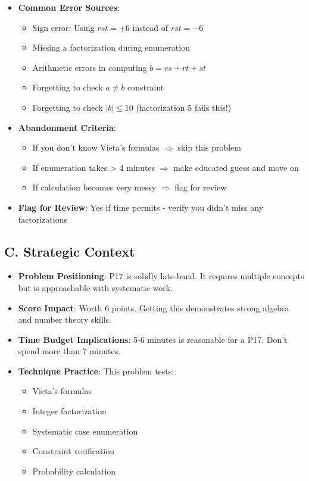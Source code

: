 \documentclass[12pt]{article}
\begin{document}
\begin{competitionbox}
\begin{itemize}[leftmargin=*]
    \item \textbf{Common Error Sources}:
    \begin{itemize}
        \item Sign error: Using $rst = +6$ instead of $rst = -6$
        \item Missing a factorization during enumeration
        \item Arithmetic errors in computing $b = rs + rt + st$
        \item Forgetting to check $a \neq b$ constraint
        \item Forgetting to check $|b| \leq 10$ (factorization 5 fails this!)
    \end{itemize}
    
    \item \textbf{Abandonment Criteria}: 
    \begin{itemize}
        \item If you don't know Vieta's formulas $\Rightarrow$ skip this problem
        \item If enumeration takes > 4 minutes $\Rightarrow$ make educated guess and move on
        \item If calculation becomes very messy $\Rightarrow$ flag for review
    \end{itemize}
    
    \item \textbf{Flag for Review}: Yes if time permits - verify you didn't miss any factorizations
\end{itemize}

\subsection*{C. Strategic Context}
\begin{itemize}[leftmargin=*]
    \item \textbf{Problem Positioning}: P17 is solidly late-band. It requires multiple concepts but is approachable with systematic work.
    
    \item \textbf{Score Impact}: Worth 6 points. Getting this demonstrates strong algebra and number theory skills.
    
    \item \textbf{Time Budget Implications}: 5-6 minutes is reasonable for a P17. Don't spend more than 7 minutes.
    
    \item \textbf{Technique Practice}: This problem tests:
    \begin{itemize}
        \item Vieta's formulas
        \item Integer factorization
        \item Systematic case enumeration
        \item Constraint verification
        \item Probability calculation
    \end{itemize}
\end{itemize}
\end{competitionbox}
\end{document}
